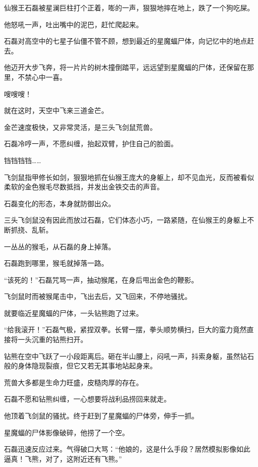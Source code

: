 
\begin{this_body}

仙猴王石磊被星澜巨柱打个正着，嘭的一声，狠狠地摔在地上，跌了一个狗吃屎。

他怒吼一声，吐出嘴中的泥巴，赶忙爬起来。

石磊对高空中的七星子仙僵不管不顾，想到最近的星魔蝠尸体，向记忆中的地点赶去。

他迈开大步飞奔，将一片片的树木撞倒踏平，远远望到星魔蝠的尸体，还保留在那里，不禁心中一喜。

嗖嗖嗖！

就在这时，天空中飞来三道金芒。

金芒速度极快，又非常灵活，是三头飞剑鼠荒兽。

石磊冷哼一声，不愿纠缠，抬起双臂，护住自己的脸面。

铛铛铛铛……

飞剑鼠指甲修长如剑，狠狠地抓在仙猴王庞大的身躯上，却不见血光，反而被看似柔软的金色猴毛尽数抵挡，并发出金铁交击的声音。

石磊变化的形态，本身就防御出众。

三头飞剑鼠没有因此而放过石磊，它们体态小巧，一路紧随，在仙猴王的身躯上不断抓挠、乱斩。

一丛丛的猴毛，从石磊的身上掉落。

石磊跑到哪里，猴毛就掉落一路。

“该死的！”石磊咒骂一声，抽动猴尾，在身后甩出金色的鞭影。

飞剑鼠时而被猴尾击中，飞出去后，又飞回来，不停地骚扰。

就要临近星魔蝠的尸体，一头钻熊跑了过来。

“给我滚开！”石磊气极，紧捏双拳。长臂一摆，拳头顺势横扫，巨大的蛮力竟然直接将一头沉重的钻熊扫开。

钻熊在空中飞跃了一小段距离后。砸在半山腰上，闷吼一声，抖索身躯，虽然钻石般的身体隐现裂痕，但它又若无其事地站起身来。

荒兽大多都是生命力旺盛，皮糙肉厚的存在。

石磊不愿和钻熊纠缠，一心想要将战利品捞回来就走。

他顶着飞剑鼠的骚扰。终于赶到了星魔蝠的尸体旁，伸手一抓。

星魔蝠的尸体影像破碎，他捞了一个空。

石磊迅速反应过来。气得破口大骂：“他娘的，这是什么手段？居然模拟影像如此逼真！飞熊，对了，这附近还有飞熊。”


\end{this_body}
